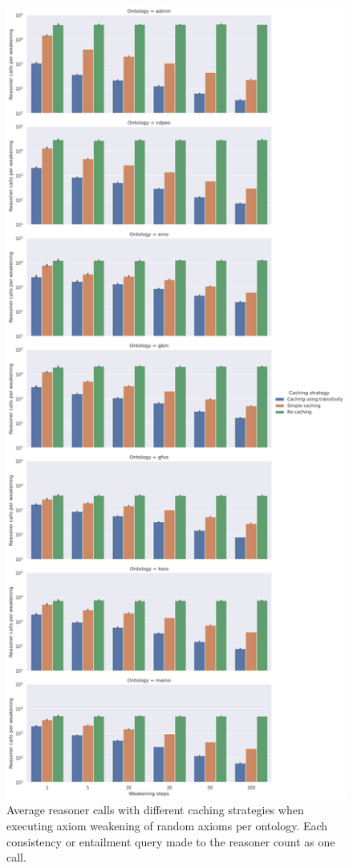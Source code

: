\begin{figure}[htbp]
  \centering
  \includegraphics[height=0.9\textheight]{resources/calls-cache-ontology-bar.png}
  \caption{Average reasoner calls with different caching strategies when executing axiom weakening of random axioms per ontology. Each consistency or entailment query made to the reasoner count as one call.}
\end{figure}


